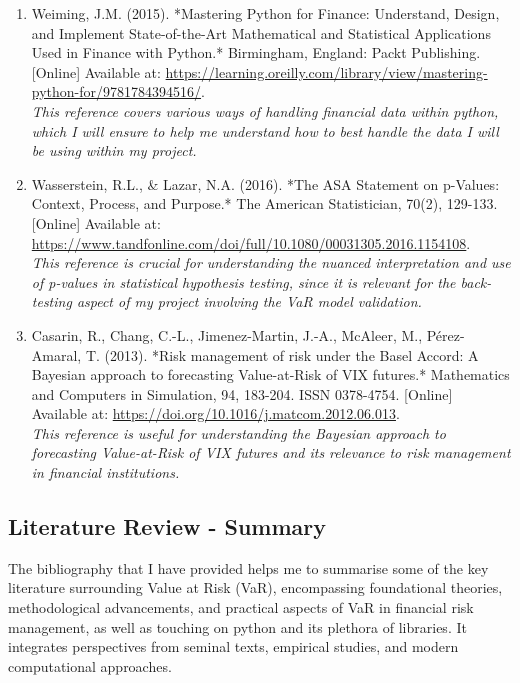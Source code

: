 \documentclass{article}
\begin{document}
\begin{small}
\begin{enumerate}
  \item\label{ref10} Weiming, J.M. (2015). *Mastering Python for Finance: Understand, Design, and Implement State-of-the-Art Mathematical and Statistical Applications Used in Finance with Python.* Birmingham, England: Packt Publishing. [Online] Available at: \url{https://learning.oreilly.com/library/view/mastering-python-for/9781784394516/}.
  \\\textit{This reference covers various ways of handling financial data within python, which I will ensure to help me understand how to best handle the data I will be using within my project.}

  \item\label{ref11} Wasserstein, R.L., \& Lazar, N.A. (2016). *The ASA Statement on p-Values: Context, Process, and Purpose.* The American Statistician, 70(2), 129-133. [Online] Available at: \url{https://www.tandfonline.com/doi/full/10.1080/00031305.2016.1154108}.
  \\\textit{This reference is crucial for understanding the nuanced interpretation and use of p-values in statistical hypothesis testing, since it is  relevant for the back-testing aspect of my project involving the VaR model validation.}

  \item\label{ref12} Casarin, R., Chang, C.-L., Jimenez-Martin, J.-A., McAleer, M., Pérez-Amaral, T. (2013). *Risk management of risk under the Basel Accord: A Bayesian approach to forecasting Value-at-Risk of VIX futures.* Mathematics and Computers in Simulation, 94, 183-204. ISSN 0378-4754. [Online] Available at: \url{https://doi.org/10.1016/j.matcom.2012.06.013}.
  \\\textit{This reference is useful for understanding the Bayesian approach to forecasting Value-at-Risk of VIX futures and its relevance to risk management in financial institutions.}

\end{enumerate}
\end{small}

\subsection{Literature Review - Summary}

The bibliography that I have provided helps me to summarise some of the key literature surrounding Value at Risk (VaR), encompassing foundational theories, methodological advancements, and practical aspects of VaR in financial risk management, as well as touching on python and its plethora of libraries. It integrates perspectives from seminal texts, empirical studies, and modern computational approaches.\\\vspace{0.3cm}
\end{document}
